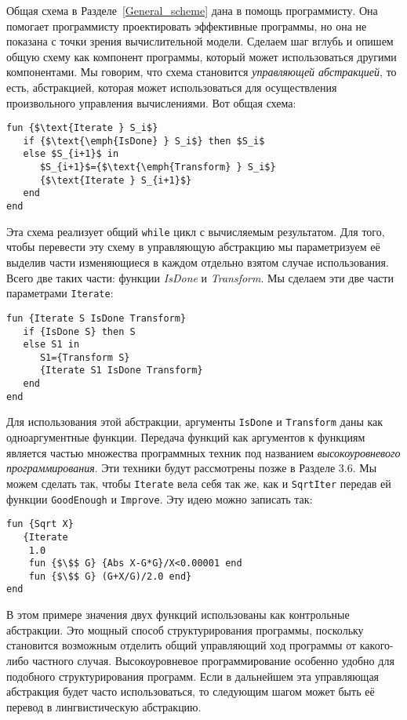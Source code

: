 Общая схема в Разделе~\ref{General_scheme} дана в помощь программисту. Она помогает программисту проектировать эффективные программы, но она не показана с точки зрения вычислительной модели. Сделаем шаг вглубь и опишем общую схему как компонент программы, который может использоваться другими компонентами. Мы говорим, что схема становится \emph{управляющей абстракцией}, то есть, абстракцией, которая может использоваться для осуществления произвольного управления вычислениями. Вот общая схема:

\begin{lstlisting}
fun {$\text{Iterate } S_i$}
   if {$\text{\emph{IsDone} } S_i$} then $S_i$
   else $S_{i+1}$ in
      $S_{i+1}$={$\text{\emph{Transform} } S_i$}
      {$\text{Iterate } S_{i+1}$}
   end
end
\end{lstlisting}

Эта схема реализует общий \lstinline!while! цикл с вычисляемым результатом. Для того, чтобы перевести эту схему в управляющую абстракцию мы параметризуем её выделив части изменяющиеся в каждом отдельно взятом случае использования. Всего две таких части: функции \emph{IsDone} и \emph{Transform}. Мы сделаем эти две части параметрами \lstinline!Iterate!:

\begin{lstlisting}
fun {Iterate S IsDone Transform}
   if {IsDone S} then S
   else S1 in
      S1={Transform S}
      {Iterate S1 IsDone Transform}
   end
end
\end{lstlisting}

Для использования этой абстракции, аргументы \lstinline!IsDone! и \lstinline!Transform! даны как одноаргументные функции. Передача функций как аргументов к функциям является частью множества программных техник под названием \emph{высокоуровневого программирования}. Эти техники будут рассмотрены позже в Разделе 3.6. Мы можем сделать так, чтобы \lstinline!Iterate! вела себя так же, как и \lstinline!SqrtIter! передав ей функции \lstinline!GoodEnough! и \lstinline!Improve!. Эту идею можно записать так:

\begin{lstlisting}
fun {Sqrt X}
   {Iterate
    1.0
    fun {$\$$ G} {Abs X-G*G}/X<0.00001 end
    fun {$\$$ G} (G+X/G)/2.0 end}
end
\end{lstlisting}

В этом примере значения двух функций использованы как контрольные абстракции. Это мощный способ структурирования программы, поскольку становится возможным отделить общий управляющий ход программы от какого-либо частного случая. Высокоуровневое программирование особенно удобно для подобного структурирования программ. Если в дальнейшем эта управляющая абстракция будет часто использоваться, то следующим шагом может быть её перевод в лингвистическую абстракцию.

